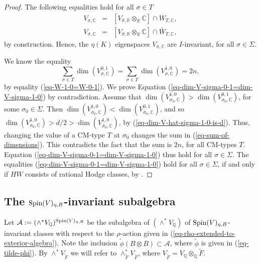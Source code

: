 \documentclass[12pt]{amsart}
\numberwithin{equation}{subsection}
\theoremstyle{plain}
\theoremstyle{definition}
\newcommand{\A}{{\mathcal A}}
\newcommand{\CC}{{\mathbb C}}
\newcommand{\QQ}{{\mathbb Q}}
\newcommand{\RR}{{\mathbb R}}
\newcommand{\T}{{\mathcal T}}
\newcommand{\Spin}{{\rm Spin}}
\begin{document}
{\begin{proof}
The following equalities hold for all $\sigma\in T$
\begin{eqnarray*}
V_{\sigma,\CC} & = & [V_{\hat{\sigma},\RR}\otimes_\RR\CC]\cap W_{T,\CC},
\\
V_{\bar{\sigma},\CC} & = & [V_{\hat{\sigma},\RR}\otimes_\RR\CC]\cap \bar{W}_{T,\CC},
\end{eqnarray*}
by construction. Hence, the $\eta(K)$ eigenspaces $V_{\sigma,\CC}$ are $I$-invariant, for all $\sigma\in\Sigma$.

We know the equality
\begin{equation}
\label{eq-sum-of-dimensions}
\sum_{\sigma\in T}\dim(V_{\sigma,\CC}^{0,1})=\sum_{\sigma\in T}\dim(V_{\sigma,\CC}^{1,0})=2n,
\end{equation}
by equality (\ref{eq-W-1-0=W-0-1}).
We prove Equation (\ref{eq-dim-V-sigma-0-1=dim-V-sigma-1-0}) by contradiction. 
Assume that $\dim(V^{1,0}_{\sigma_0,\CC})>\dim(V^{0,1}_{\sigma_0,\CC})$, for some $\sigma_0\in\Sigma$.  Then $\dim(V^{1,0}_{\bar{\sigma}_0,\CC})<\dim(V^{0,1}_{\bar{\sigma}_0,\CC})$, 
and so $\dim(V^{1,0}_{\sigma_0,\CC})>d/2>\dim(V^{1,0}_{\bar{\sigma}_0,\CC})$,
by (\ref{eq-dim-V-hat-sigma-1-0-is-d}). Thus, changing the value of a CM-type $T$ at $\sigma_0$ changes the sum in (\ref{eq-sum-of-dimensions}). This contradicts the fact that the sum is $2n$, for all CM-types $T$.
Equation (\ref{eq-dim-V-sigma-0-1=dim-V-sigma-1-0}) thus hold for all $\sigma\in\Sigma$.
The equalities (\ref{eq-dim-V-sigma-0-1=dim-V-sigma-1-0}) hold for all $\sigma\in\Sigma$, if and only if $HW$ consists of rational Hodge classes, by \cite[Prop. 4.4]{deligne-milne}.
\end{proof}



%
\subsection{The $\Spin(V)_{\eta,B}$-invariant subalgebra}
Let $\A:=(\wedge^*V_\QQ)^{\Spin(V)_{\eta,B}}$ be the subalgebra of $(\wedge^*V_\QQ)$
of $\Spin(V)_{\eta,B}$-invariant classes with respect to the $\rho$-action given in (\ref{eq-rho-extended-to-exterior-algebra}). 
Note the inclusion $\tilde{\phi}(B\otimes B)\subset \A$, where $\tilde{\phi}$ is given in (\ref{eq-tilde-phi}).
By $\wedge^*V_{\tilde{F}}$ we will refer to $\wedge^*_{\tilde{F}}V_{\tilde{F}}$, where $V_{\tilde{F}}=V_\QQ\otimes_\QQ\tilde{F}$.

}
\end{document}
